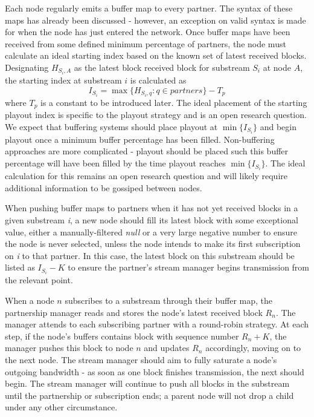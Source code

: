 \documentclass[12pt,a4paper]{article}
\begin{document}
Each node regularly emits a buffer map to every partner. The syntax of these maps has already been discussed - however, an exception on valid syntax is made for when the node has just entered the network. Once buffer maps have been received from some defined minimum percentage of partners, the node must calculate an ideal starting index based on the known set of latest received blocks. Designating \(H_{{S_i},A}\) as the latest block received block for substream \(S_i\) at node \(A\), the starting index at substream \(i\) is calculated as \[I_{S_i} = \max\{H_{{S_i},q} : q \in partners\} - T_p\] where \(T_p\) is a constant to be introduced later. The ideal placement of the starting playout index is specific to the playout strategy and is an open research question. We expect that buffering systems should place playout at \(\min\{I_{S_i}\}\) and begin playout once a minimum buffer percentage has been filled. Non-buffering approaches are more complicated - playout should be placed such this buffer percentage will have been filled by the time playout reaches \(\min\{I_{S_i}\}\). The ideal calculation for this remains an open research question and will likely require additional information to be gossiped between nodes.

When pushing buffer maps to partners when it has not yet received blocks in a given substream \textit{i}, a new node should fill its latest block with some exceptional value, either a manually-filtered \textit{null} or a very large negative number to ensure the node is never selected, unless the node intends to make its first subscription on \textit{i} to that partner. In this case, the latest block on this substream should be listed as \(I_{S_i} - K\) to ensure the partner's stream manager begins transmission from the relevant point.

When a node \(n\) subscribes to a substream through their buffer map, the partnership manager reads and stores the node's latest received block \(R_n\). The manager attends to each subscribing partner with a round-robin strategy. At each step, if the node's buffers contains block with sequence number \(R_n + K\), the manager pushes this block to node \(n\) and updates \(R_n\) accordingly, moving on to the next node. The stream manager should aim to fully saturate a node's outgoing bandwidth - as soon as one block finishes transmission, the next should begin. The stream manager will continue to push all blocks in the substream until the partnership or subscription ends; a parent node will not drop a child under any other circumstance.
\end{document}
